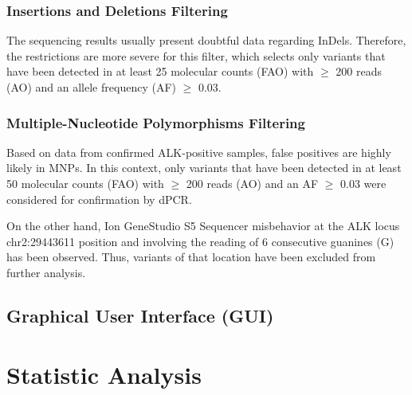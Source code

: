 \subsubsection{Insertions and Deletions Filtering}

The sequencing results usually present doubtful data regarding InDels. Therefore, the restrictions are more severe for this filter, which selects only variants that have been detected in at least 25 molecular counts (FAO) with $\ge$ 200 reads (AO) and an allele frequency (AF) $\ge$ 0.03.

\subsubsection{Multiple-Nucleotide Polymorphisms Filtering}

Based on data from confirmed ALK-positive samples, false positives are highly likely in MNPs. In this context, only variants that have been detected in at least 50 molecular counts (FAO) with $\ge$ 200 reads (AO) and an AF $\ge$ 0.03 were considered for confirmation by dPCR. 

On the other hand, Ion GeneStudio\texttrademark{} S5 Sequencer misbehavior at the ALK locus chr2:29443611 position and involving the reading of 6 consecutive guanines (G) has been observed. Thus, variants of that location have been excluded from further analysis.

\subsection{Graphical User Interface (GUI)}



\section{Statistic Analysis}

